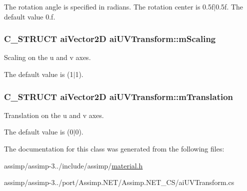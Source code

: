 The rotation angle is specified in radians. The rotation center is 0.\+5f$\vert$0.5f. The default value 0.\+f. \hypertarget{structai_u_v_transform_a89429a027cbf914e7212e48149a957c8}{
\subsubsection[{m\+Scaling}]{\setlength{\rightskip}{0pt plus 5cm}C\+\_\+\+S\+T\+R\+U\+C\+T {\bf ai\+Vector2\+D} ai\+U\+V\+Transform\+::m\+Scaling}}\label{structai_u_v_transform_a89429a027cbf914e7212e48149a957c8}
Scaling on the u and v axes.

The default value is (1$\vert$1). \hypertarget{structai_u_v_transform_a8c7f35959aa342bf0cef670246fbb813}{
\subsubsection[{m\+Translation}]{\setlength{\rightskip}{0pt plus 5cm}C\+\_\+\+S\+T\+R\+U\+C\+T {\bf ai\+Vector2\+D} ai\+U\+V\+Transform\+::m\+Translation}}\label{structai_u_v_transform_a8c7f35959aa342bf0cef670246fbb813}
Translation on the u and v axes.

The default value is (0$\vert$0). 

The documentation for this class was generated from the following files\+:\begin{DoxyCompactItemize}
\item 
assimp/assimp-\/3../include/assimp/\hyperlink{material_8h}{material.\+h}\item 
assimp/assimp-\/3../port/\+Assimp.\+N\+E\+T/\+Assimp.\+N\+E\+T\+\_\+\+C\+S/ai\+U\+V\+Transform.\+cs\end{DoxyCompactItemize}
